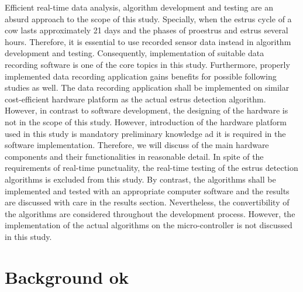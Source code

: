 \documentclass[english,12pt,a4paper,pdftex,elec,utf8]{aaltothesis}
\begin{document}
Efficient real-time data analysis, algorithm development and testing are an absurd approach to the scope of this study. Specially, when the estrus cycle of a cow lasts approximately 21 days and the phases of proestrus and estrus several hours. Therefore, it is essential to use recorded sensor data instead in algorithm development and testing. Consequently, implementation of suitable data recording software is one of the core topics in this study. Furthermore, properly implemented data recording application gains benefits for possible following studies as well. The data recording application shall be implemented on similar cost-efficient hardware platform as the actual estrus detection algorithm. However, in contrast to software development, the designing of the hardware is not in the scope of this study. However, introduction of the hardware platform used in this study is mandatory preliminary knowledge ad it is required in the software implementation. Therefore, we will discuss of the main hardware components and their functionalities in reasonable detail. In spite of the requirements of real-time punctuality, the real-time testing of the estrus detection algorithms is excluded from this study. By contrast, the algorithms shall be implemented and tested with an appropriate computer software  and the results are discussed with care in the results section. Nevertheless, the convertibility of the algorithms are considered throughout the development process. However, the implementation of the actual algorithms on the micro-controller is not discussed in this study.


%
%
%
%



\clearpage 

\section{Background ok} \label{backgroundsection}
 
\end{document}
